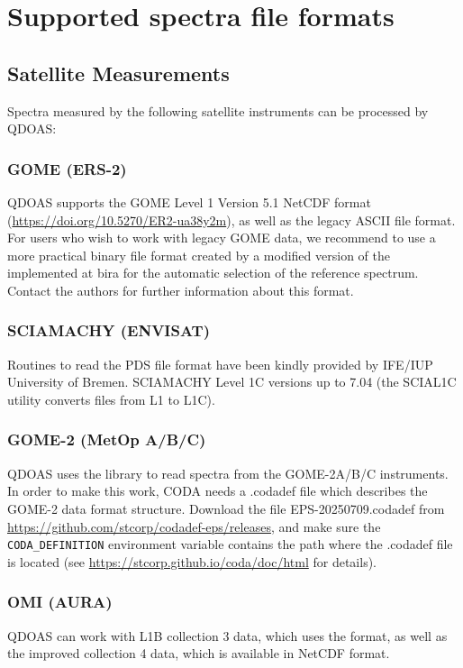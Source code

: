 \section{Supported spectra file formats} \label{sec:intro-formats}
\subsection{Satellite Measurements}
Spectra measured by the following satellite instruments can be processed by QDOAS:

\subsubsection{GOME (ERS-2)}
QDOAS supports the GOME Level 1 Version 5.1 NetCDF format (\url{https://doi.org/10.5270/ER2-ua38y2m}), as well as
the legacy ASCII file format.  For users who wish to work with legacy
GOME data, we recommend to use a more practical binary file format
created by a modified version of the  implemented at
\gls{bira} for the automatic selection of the reference spectrum.
Contact the authors for further information about this format.

\subsubsection{SCIAMACHY (ENVISAT)}
Routines to read the  PDS file format
have been kindly provided by IFE/IUP University of Bremen.  SCIAMACHY
Level 1C versions up to 7.04 (the SCIAL1C utility converts files from
L1 to L1C).

\subsubsection{GOME-2 (MetOp A/B/C)}
QDOAS uses the  library to read spectra from the
GOME-2A/B/C instruments.  In order to make this work, CODA needs a
.codadef file which describes the GOME-2 data format structure.
Download the file EPS-20250709.codadef from
\url{https://github.com/stcorp/codadef-eps/releases}, and make sure
the \verb|CODA_DEFINITION| environment variable contains the path
where the .codadef file is located (see
\url{https://stcorp.github.io/coda/doc/html} for details).

\subsubsection{OMI (AURA)}
QDOAS can work with  L1B collection 3 data, which
uses the  format, as well as the improved
collection 4 data, which is available in NetCDF format.

